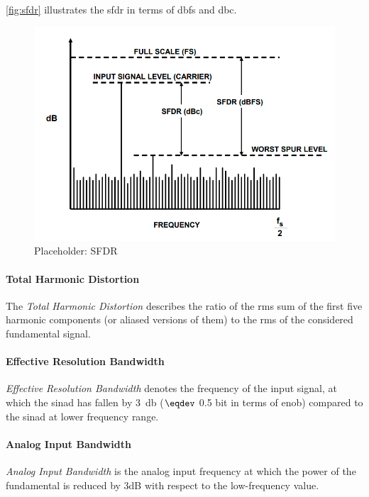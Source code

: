 \autoref{fig:sfdr} illustrates the \gls{sfdr} in terms of \gls{dbfs} and \gls{dbc}.

\begin{figure}[tbh]
	\centering
	\includegraphics[width = \textwidth]{chap/02-theory/img/sfdr}
	\caption{Placeholder: SFDR \cite{walt2009}}
	\label{fig:sfdr}
\end{figure}
\paragraph{Total Harmonic Distortion}
The \textit{Total Harmonic Distortion} describes the ratio of the \gls{rms} sum of the first five harmonic components (or aliased versions of them) to the \gls{rms} of the considered fundamental signal. \cite{Lundberg}

\paragraph{Effective Resolution Bandwidth}
\textit{Effective Resolution Bandwidth} denotes the frequency of the input signal, at which the \gls{sinad} has fallen by \SI{3}{\decibel} ($\eqdev$ 0.5 bit in terms of \gls{enob}) compared to the \gls{sinad} at lower frequency range. \cite{Lundberg}

\paragraph{Analog Input Bandwidth}
\textit{Analog Input Bandwidth} is the analog input frequency at which the power of the fundamental is reduced by 3dB with respect to the low-frequency value.

